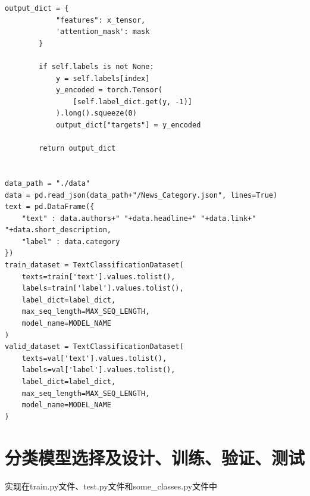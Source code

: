\documentclass{article}
\begin{document}
\begin{lstlisting}[style=Style]
        output_dict = {
            "features": x_tensor,
            'attention_mask': mask
        }

        if self.labels is not None:
            y = self.labels[index]
            y_encoded = torch.Tensor(
                [self.label_dict.get(y, -1)]
            ).long().squeeze(0)
            output_dict["targets"] = y_encoded

        return output_dict


data_path = "./data"
data = pd.read_json(data_path+"/News_Category.json", lines=True)
text = pd.DataFrame({
    "text" : data.authors+" "+data.headline+" "+data.link+" "+data.short_description,
    "label" : data.category
})
train_dataset = TextClassificationDataset(
    texts=train['text'].values.tolist(),
    labels=train['label'].values.tolist(),
    label_dict=label_dict,
    max_seq_length=MAX_SEQ_LENGTH,
    model_name=MODEL_NAME
)
valid_dataset = TextClassificationDataset(
    texts=val['text'].values.tolist(),
    labels=val['label'].values.tolist(),
    label_dict=label_dict,
    max_seq_length=MAX_SEQ_LENGTH,
    model_name=MODEL_NAME
)
\end{lstlisting}
\section{分类模型选择及设计、训练、验证、测试}
实现在train.py文件、test.py文件和some\_classes.py文件中
\end{document}

